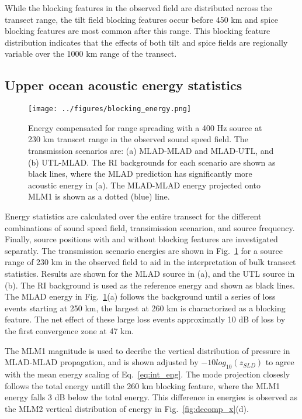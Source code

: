 \documentclass[preprint,NumberedRefs]{JASA}
\begin{document}
While the blocking features in the observed field are distributed across the transect range, the tilt field blocking features occur before 450 km and spice blocking features are most common after this range. This blocking feature distribution indicates that the effects of both tilt and spice fields are regionally variable over the 1000 km range of the transect.

\subsection{Upper ocean acoustic energy statistics}\label{ssec:energy}
\begin{figure}
\texttt{[image: ../figures/blocking\_energy.png]}
    \caption{Energy compensated for range spreading with a 400 Hz source at 230 km transcet range in the observed sound speed field. The transmission scenarios are: (a) MLAD-MLAD and MLAD-UTL, and (b) UTL-MLAD. The RI backgrounds for each scenario are shown as black lines, where the MLAD prediction has significantly more acoustic energy in (a). The MLAD-MLAD energy projected onto MLM1 is shown as a dotted (blue) line.}
    \label{fig:ml_energy}
\end{figure}
Energy statistics are calculated over the entire transect for the different combinations of sound speed field, transimission scenarion, and source frequency. Finally, source positions with and without blocking features are investigated separatly. The transmission scenario energies are shown in Fig.~\ref{fig:ml_energy} for a source range of 230 km in the observed field to aid in the interpretation of bulk transect statistics. Results are shown for the MLAD source in (a), and the UTL source in (b). The RI background is used as the reference energy and shown as black lines. The MLAD energy in Fig.~\ref{fig:ml_energy}(a) follows the background until a series of loss events starting at 250 km, the largest at 260 km is charactorized as a blocking feature. The net effect of these large loss events approximatly 10 dB of loss by the first convergence zone at 47 km.

The MLM1 magnitude is used to decribe the vertical distribution of pressure in MLAD-MLAD propagation, and is shown adjusted by $-10 log_{10}(z_{SLD})$ to agree with the mean energy scaling of Eq.~\eqref{eq:int_eng}. The mode projection closesly follows the total energy untill the 260 km blocking feature, where the MLM1 energy falls 3 dB below the total energy. This difference in energies is observed as the MLM2 vertical distribution of energy in Fig.~\ref{fig:decomp_x}(d).
\end{document}
